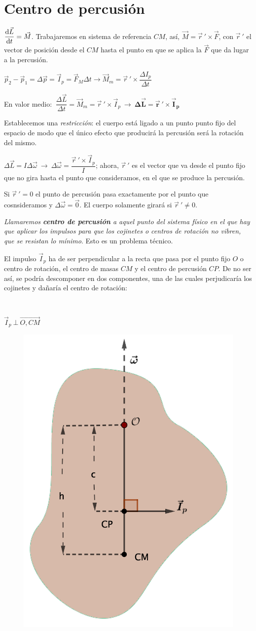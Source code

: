 \section{Centro de percusión}

$\displaystyle \dv{\vec L}{t}=\vec M$.  Trabajaremos en sistema de referencia $CM$, así, $\vec M=\vec r\ ' \times \vec F$, con $\vec r\ '$ el vector de posición desde el $CM$ hasta el punto en que se aplica la $\vec F$ que da lugar a la percusión.

 $\vec p_2-\vec p_1=\Delta \vec p=\vec I_p =\vec F_M \Delta t \to \vec M_m=\vec r \ ' \times \dfrac{\Delta I_p}{\Delta t}$
 
 En valor medio: $\ \dfrac {\Delta \vec L}{\Delta t}=\vec M_m=\vec r\ ' \times \vec I_p \ \to \ \boldsymbol{\Delta \vec L = \vec r \ ' \times \vec I_p}$

Establecemos una \emph{restricción}: el cuerpo está ligado a un punto punto fijo del espacio de modo que el único efecto que producirá la percusión será la rotación del mismo.

$\Delta \vec L=I\Delta \vec \omega \ \to \ \Delta \vec \omega = \dfrac{\vec r\ ' \times \vec I_p}{I}$; ahora, $\vec r\ '$ es el vector que va desde el punto fijo que no gira hasta el punto que consideramos, en el que se produce la percusión.

Si $\vec r\ '=0$ el punto de percusión pasa exactamente por el punto que cosnsideramos y $\Delta \vec \omega =\vec 0$. El cuerpo solamente girará si $\vec r\ '\neq 0$.

\emph{Llamaremos \textbf{centro de percusión} a aquel punto del sistema físico en el que hay que aplicar los impulsos para que los cojinetes o centros de rotación no vibren, que se resistan lo mínimo}. Esto es un problema técnico.

\begin{multicols}{2}
El impulso $\vec I_p$ ha de ser perpendicular a la recta que pasa por el punto fijo $O$ o centro de rotación, el centro de masas $CM$ y el centro de percusión $CP$. De no ser así, se podría descomponer en dos componentes, una de las cuales perjudicaría los cojinetes y dañaría el centro de rotación:

$\quad$

 $ \vec I_p \ \bot \ \overrightarrow{O,CM}$
\begin{figure}[H]
	\centering
	\includegraphics[width=.3\textwidth]{imagenes/imagenes17/T17IM01.png}
	\end{figure}	
\end{multicols}


